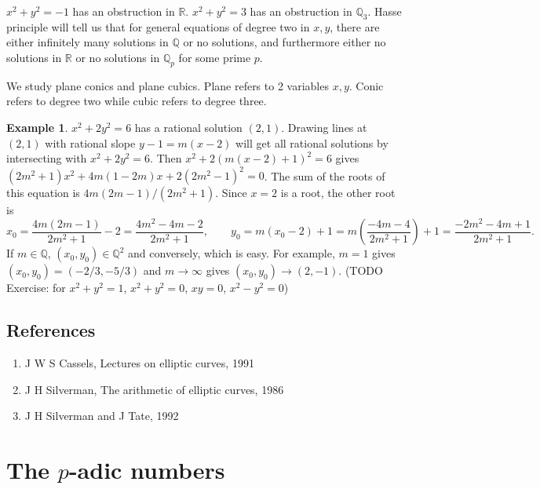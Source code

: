 \documentclass{article}
\newcommand{\Q}{\mathbb{Q}}
\newcommand{\R}{\mathbb{R}}
\newcommand{\rb}[1]{\left( #1 \right)}
\theoremstyle{definition}\newtheorem{definition}{Definition}[section]
\theoremstyle{definition}\newtheorem{remark}[definition]{Remark}
\theoremstyle{definition}\newtheorem*{example}{Example}
\theoremstyle{definition}\newtheorem*{note}{Note}
\begin{document}
$ x^2 + y^2 = -1 $ has an obstruction in $ \R $. $ x^2 + y^2 = 3 $ has an obstruction in $ \Q_3 $. Hasse principle will tell us that for general equations of degree two in $ x, y $, there are either infinitely many solutions in $ \Q $ or no solutions, and furthermore either no solutions in $ \R $ or no solutions in $ \Q_p $ for some prime $ p $.


We study plane conics and plane cubics. Plane refers to 2 variables $ x, y $. Conic refers to degree two while cubic refers to degree three.

\begin{example}
$ x^2 + 2y^2 = 6 $ has a rational solution $ \rb{2, 1} $. Drawing lines at $ \rb{2, 1} $ with rational slope $ y - 1 = m\rb{x - 2} $ will get all rational solutions by intersecting with $ x^2 + 2y^2 = 6 $. Then $ x^2 + 2\rb{m\rb{x - 2} + 1}^2 = 6 $ gives $ \rb{2m^2 + 1}x^2 + 4m\rb{1 - 2m}x + 2\rb{2m^2 - 1}^2 = 0 $. The sum of the roots of this equation is $ 4m\rb{2m - 1} / \rb{2m^2 + 1} $. Since $ x = 2 $ is a root, the other root is
$$ x_0 = \dfrac{4m\rb{2m - 1}}{2m^2 + 1} - 2 = \dfrac{4m^2 - 4m - 2}{2m^2 + 1}, \qquad y_0 = m\rb{x_0 - 2} + 1 = m\rb{\dfrac{-4m - 4}{2m^2 + 1}} + 1 = \dfrac{-2m^2 - 4m + 1}{2m^2 + 1}. $$
If $ m \in \Q $, $ \rb{x_0, y_0} \in \Q^2 $ and conversely, which is easy. For example, $ m = 1 $ gives $ \rb{x_0, y_0} = \rb{-2 / 3, -5 / 3} $ and $ m \to \infty $ gives $ \rb{x_0, y_0} \to \rb{2, -1} $. (TODO Exercise: for $ x^2 + y^2 = 1 $, $ x^2 + y^2 = 0 $, $ xy = 0 $, $ x^2 - y^2 = 0 $)
\end{example}

\subsection{References}

\begin{enumerate}
\item J W S Cassels, Lectures on elliptic curves, 1991
\item J H Silverman, The arithmetic of elliptic curves, 1986
\item J H Silverman and J Tate, 1992
\end{enumerate}

\pagebreak

\section{The $ p $-adic numbers}
\end{document}
